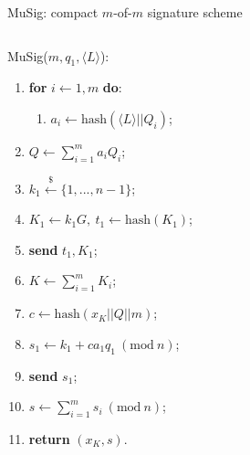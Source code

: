 \documentclass[slidescentered]{beamer}
\begin{document}
	\begin{frame}{MuSig: compact $m$-of-$m$ signature scheme}
		\begin{columns}
			\begin{column}{0.5\linewidth}
				MuSig($m, q_1, \langle L \rangle$):
				\begin{enumerate}
					\item<2 -> \textbf{for} $i \gets 1, m$ \textbf{do}:
					\begin{enumerate}
						\item<2 -> $a_i \gets \text{hash}(\langle L\rangle || Q_i)$;
					\end{enumerate}
					\item<3 -> $Q \gets \sum_{i = 1}^{m} a_iQ_i$;
					\item<4 -> $k_1 \xleftarrow{\text{\$}} \{1, ..., n - 1\}$;
					\item<5 -> $K_1 \gets k_1G, \ t_1 \gets \text{hash}(K_1)$;
					\item<6 -> \textbf{send} $t_1, K_1$;
					\item<11 -> $K \gets \sum_{i = 1}^{m} K_i$;
					\item<13 -> $c \gets \text{hash}(x_K || Q || m)$;
					\item<14 -> $s_1 \gets k_1 + ca_1q_1 \ (\text{mod} \ n)$;
					\item<15 -> \textbf{send} $s_1$;
					\item<17 -> $s \gets \sum_{i = 1}^{m} s_i \ (\text{mod} \ n)$;
					\item<18 -> \textbf{return} $(x_K , s)$.
				\end{enumerate}
			\end{column}
			\begin{column}{0.62\linewidth}
				\begin{center}
\end{center}
\end{column}
\end{columns}
\end{frame}
\end{document}
